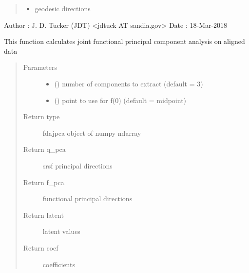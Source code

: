 \documentclass[letterpaper,10pt,english]{sphinxmanual}
\begin{document}
\begin{fulllineitems}
\begin{quote}
\begin{description}
\begin{itemize}
\item {} 
 \textendash{} geodesic directions

\end{itemize}

\end{description}\end{quote}

Author :  J. D. Tucker (JDT) \textless{}jdtuck AT sandia.gov\textgreater{}
Date   :  18-Mar-2018

\begin{fulllineitems}
\label{\detokenize{fPCA:fPCA.fdajpca.calc_fpca}}
This function calculates joint functional principal component analysis
on aligned data
\begin{quote}\begin{description}
\item[{Parameters}] \leavevmode\begin{itemize}
\item {} 
 () \textendash{} number of components to extract (default = 3)

\item {} 
 () \textendash{} point to use for f(0) (default = midpoint)

\end{itemize}

\item[{Return type}] \leavevmode
fdajpca object of numpy ndarray

\item[{Return q\_pca}] \leavevmode
srsf principal directions

\item[{Return f\_pca}] \leavevmode
functional principal directions

\item[{Return latent}] \leavevmode
latent values

\item[{Return coef}] \leavevmode
coefficients


\end{description}
\end{quote}
\end{fulllineitems}
\end{fulllineitems}
\end{document}
